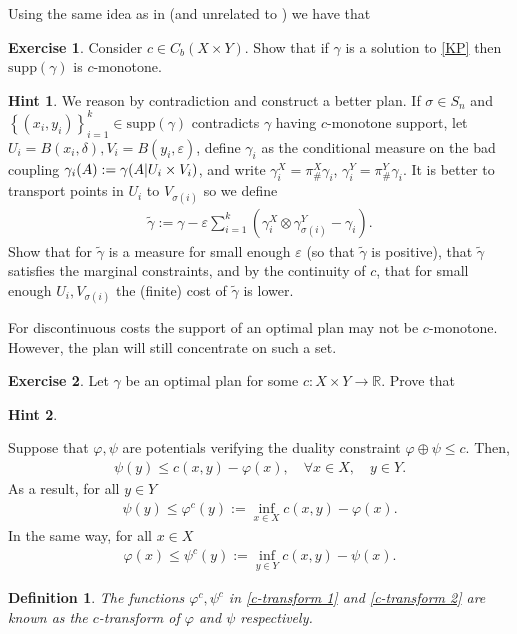 \documentclass[
    a4paper,
    DIV=14,
    abstract=true,
    numbers=noenddot
]
{scrartcl}
\newtheorem{definition}[definition]{Definition}
\theoremstyle{definition}
\newtheorem{exercise}{Exercise}
\newtheorem*{hint}{Hint}
\newcommand{\eps}{\varepsilon}
\newcommand{\tl}[1]{\widetilde{#1}}
\newcommand{\set}[1]{\left\{#1\right\}}
\newcommand{\rmm}[1]{\mathrm{#1}}
\newcommand{\R}{\mathbb{R}}
\begin{document}
Using the same idea as in  (and unrelated to ) we have that
\begin{exercise}\label{ex:continuous transport is c-monotone}
    Consider $c \in C_b(X\times Y)$. Show that if $\gamma $ is a solution to \eqref{KP} then $\rmm{supp}(\gamma)$ is $c$-monotone.
\end{exercise}
\begin{hint}
    We reason by contradiction and construct a better plan. If $\sigma \in S_n$ and  $\set{(x_i,y_i)}_{i=1}^k \in \rmm{supp}(\gamma )$ contradicts $\gamma $ having $c$-monotone support, let $U_i=B(x_i,\delta ), V_i=B(y_i, \eps )$,  define $\gamma_i$ as the conditional measure on the bad coupling $\gamma_i(A):= \gamma\qty(A| U_i \times V_i)$, and write $\gamma_i^X = \pi _{\#}^X \gamma_i$, $ \gamma_{i}^Y= \pi _{\#}^Y \gamma_i$. It is better to transport points in $U_i$ to $V_{\sigma (i)}$  so we  define
    \begin{align*}
        \tl{\gamma }:= \gamma - \eps \sum_{i=1}^k (\gamma_i^X \otimes \gamma_{\sigma(i)}^Y - \gamma_i ).
    \end{align*}
    Show that for $\tl{\gamma } $ is a measure for small enough $\eps $ (so that $\tl{\gamma } $ is positive), that $\tl{\gamma } $ satisfies the marginal constraints, and by the continuity of $c$, that for small enough $U_i,V_{\sigma(i)}$ the (finite) cost of $\tl{\gamma } $ is lower.
\end{hint}
For discontinuous costs the support of an optimal plan may not be $c$-monotone. However, the plan will still concentrate on such a set.
\begin{exercise}
    Let $\gamma $ be an optimal plan for some $c: X\times Y \to \R$. Prove that
\end{exercise}
\begin{hint}

\end{hint}




Suppose that $\varphi, \psi  $ are potentials verifying the duality constraint $\varphi \oplus \psi \leq c$. Then,
\begin{align*}
    \psi (y) \leq c(x,y)- \varphi(x), \quad\forall x \in X, \quad y \in Y.
\end{align*}
As a result, for all $y \in Y$
\begin{align}\label{c-transform 1}
    \psi (y) \leq \varphi^c(y):= \inf_{x \in X} c(x,y) - \varphi (x).
\end{align}
In the same way, for all $x \in X$
\begin{align}\label{c-transform 2}
    \varphi (x) \leq \psi ^c(y):= \inf_{y \in Y} c(x,y) - \psi  (x).
\end{align}
\begin{definition}
    The functions $\varphi^c, \psi ^c$ in \eqref{c-transform 1} and \eqref{c-transform 2}  are known as the \emph{$c$-transform} of $\varphi$ and $\psi $ respectively.
\end{definition}
\end{document}
